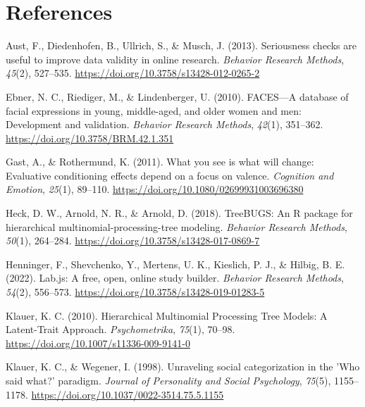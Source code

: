 \documentclass[
  doc,floatsintext]{apa6}
\newlength{\cslhangindent}
\newlength{\cslentryspacingunit} %
\newenvironment{CSLReferences}[2] %
 {%
  \setlength{\parindent}{0pt}
  \ifodd #1
  \let\oldpar\par
  \def\par{\hangindent=\cslhangindent\oldpar}
  \fi
  \setlength{\parskip}{#2\cslentryspacingunit}
 }%
 {}
\begin{document}
\hypertarget{references}{%
\section{References}\label{references}}

\hypertarget{refs}{}
\begin{CSLReferences}{1}{0}
\leavevmode{}%
Aust, F., Diedenhofen, B., Ullrich, S., \& Musch, J. (2013). Seriousness checks are useful to improve data validity in online research. \emph{Behavior Research Methods}, \emph{45}(2), 527--535. \url{https://doi.org/10.3758/s13428-012-0265-2}

\leavevmode{}%
Ebner, N. C., Riediger, M., \& Lindenberger, U. (2010). {FACES}---{A} database of facial expressions in young, middle-aged, and older women and men: {Development} and validation. \emph{Behavior Research Methods}, \emph{42}(1), 351--362. \url{https://doi.org/10.3758/BRM.42.1.351}

\leavevmode{}%
Gast, A., \& Rothermund, K. (2011). What you see is what will change: {Evaluative} conditioning effects depend on a focus on valence. \emph{Cognition and Emotion}, \emph{25}(1), 89--110. \url{https://doi.org/10.1080/02699931003696380}

\leavevmode{}%
Heck, D. W., Arnold, N. R., \& Arnold, D. (2018). {TreeBUGS}: {An R} package for hierarchical multinomial-processing-tree modeling. \emph{Behavior Research Methods}, \emph{50}(1), 264--284. \url{https://doi.org/10.3758/s13428-017-0869-7}

\leavevmode{}%
Henninger, F., Shevchenko, Y., Mertens, U. K., Kieslich, P. J., \& Hilbig, B. E. (2022). Lab.js: {A} free, open, online study builder. \emph{Behavior Research Methods}, \emph{54}(2), 556--573. \url{https://doi.org/10.3758/s13428-019-01283-5}

\leavevmode{}%
Klauer, K. C. (2010). Hierarchical {Multinomial Processing Tree Models}: {A Latent-Trait Approach}. \emph{Psychometrika}, \emph{75}(1), 70--98. \url{https://doi.org/10.1007/s11336-009-9141-0}

\leavevmode{}%
Klauer, K. C., \& Wegener, I. (1998). Unraveling social categorization in the '{Who} said what?' paradigm. \emph{Journal of Personality and Social Psychology}, \emph{75}(5), 1155--1178. \url{https://doi.org/10.1037/0022-3514.75.5.1155}


\end{CSLReferences}
\end{document}
